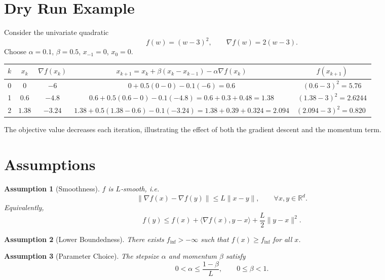 \documentclass{article}
\newtheorem{assumption}{Assumption}[section]
\begin{document}
\section*{Dry Run Example}
Consider the univariate quadratic
\[
f(w)=(w-3)^2,\qquad \nabla f(w)=2(w-3).
\]
Choose $\alpha=0.1$, $\beta=0.5$, $x_{-1}=0$, $x_0=0$.

\begin{center}
\begin{tabular}{c|c|c|c|c}
$k$ & $x_k$ & $\nabla f(x_k)$ & $x_{k+1}=x_k+\beta(x_k-x_{k-1})-\alpha\nabla f(x_k)$ & $f(x_{k+1})$\\\hline
0 & $0$ & $-6$ & $0+0.5(0-0)-0.1(-6)=0.6$ & $(0.6-3)^2=5.76$\\
1 & $0.6$ & $-4.8$ & $0.6+0.5(0.6-0)-0.1(-4.8)=0.6+0.3+0.48=1.38$ & $(1.38-3)^2=2.6244$\\
2 & $1.38$ & $-3.24$ & $1.38+0.5(1.38-0.6)-0.1(-3.24)=1.38+0.39+0.324=2.094$ & $(2.094-3)^2=0.820\,\,$
\end{tabular}
\end{center}
The objective value decreases each iteration, illustrating the effect of
both the gradient descent and the momentum term.

\newpage
\section*{Assumptions}
\begin{assumption}[Smoothness]\label{ass:smooth}
$f$ is $L$‑smooth, i.e.
\[
\|\nabla f(x)-\nabla f(y)\|\le L\|x-y\|,\qquad \forall x,y\in\mathbb{R}^{d}.
\]
Equivalently,
\[
f(y)\le f(x)+\langle\nabla f(x),y-x\rangle+\frac{L}{2}\|y-x\|^{2}.
\tag{A.1}
\]
\end{assumption}

\begin{assumption}[Lower Boundedness]\label{ass:lb}
There exists $f_{\inf}>-\infty$ such that $f(x)\ge f_{\inf}$ for all $x$.
\end{assumption}

\begin{assumption}[Parameter Choice]\label{ass:param}
The stepsize $\alpha$ and momentum $\beta$ satisfy
\[
0<\alpha\le \frac{1-\beta}{L},\qquad 0\le\beta<1.
\tag{A.2}
\]
\end{assumption}

\end{document}
